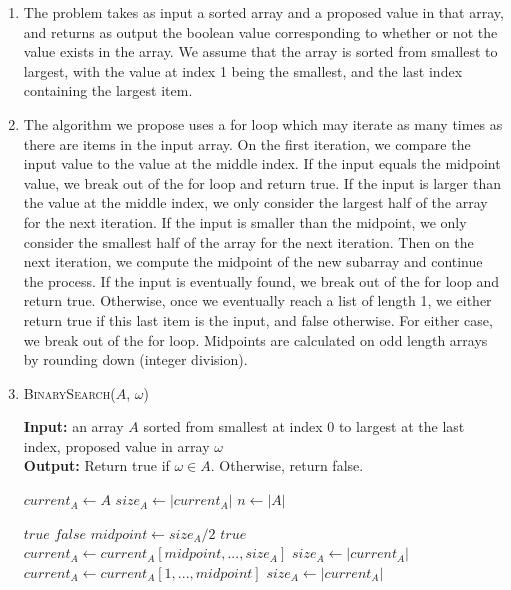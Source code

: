 \documentclass{article}
\begin{document}
\begin{enumerate}
	\item The problem takes as input a sorted array and a proposed value in that array, and returns
		as output the boolean value corresponding to whether or not the value exists in the array.
		We assume that the array is sorted from smallest to largest, with the value at index 1
		being the smallest, and the last index containing the largest item.
	\item The algorithm we propose uses a for loop which may iterate as many times as there are items in
		the input array. On the first iteration, we compare the input value to the value at the middle
		index. If the input equals the midpoint value, we break out of the for loop and return true.
		If the input is larger than the value at the middle index, we only consider the largest
		half of the array for the next iteration. If the input is smaller than the midpoint, we only
		consider the smallest half of the array for the next iteration. Then on the next iteration,
		we compute the midpoint of the new subarray and continue the process. If the input is eventually
		found, we break out of the for loop and return true. Otherwise, once we eventually reach
		a list of length 1, we either return true if this last item is the input, and false otherwise.
		For either case, we break out of the for loop. Midpoints are calculated on odd length arrays
		by rounding down (integer division).
        \item
                \begin{algorithm}\caption{\textsc{BinarySearch}($A$, $\omega$)}\label{alg:bs}
                        {\bf Input:} an array $A$ sorted from smallest at index 0 to largest at the last index,
                        proposed value in array $\omega$\\
                        {\bf Output:} Return true if $\omega \in A$. Otherwise, return false.
                \begin{algorithmic}[1]

			\State $current_A \gets A$
                        \State $size_A \gets |current_A|$
			\State $n \gets |A|$

						\State \Return $true$
					\Else
						\State \Return $false$
					\EndIf
				\EndIf
				\State $midpoint \gets size_A/2$
                              		\State \Return $true$
				\EndIf
				\If{$\omega > current_A[midpoint$}
					\State $current_A \gets current_A[midpoint,...,size_A]$
					\State $size_A \gets |current_A|$
					\State $current_A \gets current_A[1,...,midpoint]$
					\State $size_A \gets |current_A|$
				\EndIf
                        \EndWhile


\end{algorithmic}
\end{algorithm}
\end{enumerate}
\end{document}
